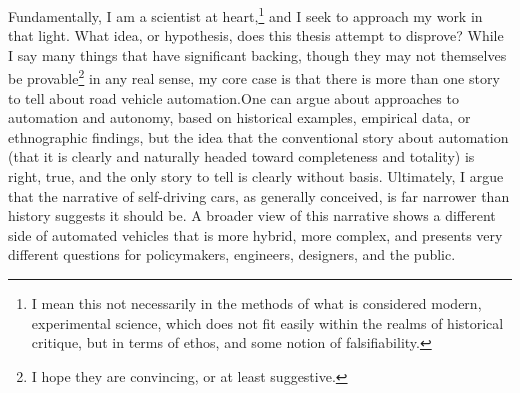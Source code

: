 Fundamentally, I am a scientist at heart,\footnote{I mean this not necessarily in
  the methods of what is considered modern, experimental science,
  which does not fit easily within the realms of historical critique,
  but in terms of ethos, and some notion of falsifiability.} and I seek to approach my
work in that light. What idea, or hypothesis, does this thesis attempt
to disprove? While I say many things that have significant backing,
though they may not themselves be provable\footnote{I hope they are
  convincing, or at least suggestive.} in any real sense, my core case
is that there is more than one story to tell about road vehicle
automation.\footnotemark One can argue about approaches to automation and autonomy,
based on historical examples, empirical data, or ethnographic
findings, but the idea that the conventional story about automation
(that it is clearly and naturally headed toward completeness and
totality) is right, true, and the only story to tell is clearly
without basis. Ultimately, I argue that the narrative of self-driving cars, as
generally conceived, is far narrower than history suggests it should
be. A broader view of this narrative shows a different side of
automated vehicles that is more hybrid, more complex, and presents
very different questions for policymakers, engineers, designers, and
the public. 



